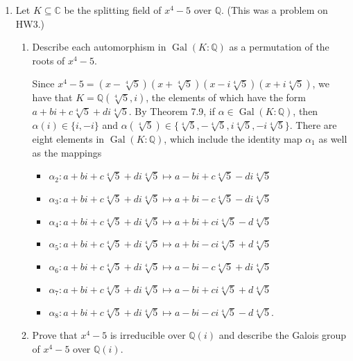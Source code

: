 \documentclass[12pt]{article}
\newcommand{\QQ}{\mathbb{Q}}
\newcommand{\CC}{\mathbb{C}}
\DeclareMathOperator{\Gal}{Gal}
\begin{document}
\begin{enumerate}
    \item
        Let $K \subseteq \CC$ be the splitting field of $x^4-5$ over $\QQ$. (This was a problem on HW3.)
        \begin{enumerate}
            \item
                Describe each automorphism in $\Gal(K:\QQ)$ as a permutation of the roots of $x^4-5$. \par
                Since $x^4 - 5 = (x - \sqrt[4]{5})(x + \sqrt[4]{5})(x - i\sqrt[4]{5})(x + i\sqrt[4]{5})$, we have that $K = \QQ(\sqrt[4]{5}, i)$, the elements of which have the form $a + bi + c\sqrt[4]{5} + di\sqrt[4]{5}$. By Theorem 7.9, if $\alpha \in \Gal(K:\QQ)$, then $\alpha(i) \in \{ i, -i \}$ and $\alpha(\sqrt[4]{5}) \in \{ \sqrt[4]{5}, -\sqrt[4]{5}, i\sqrt[4]{5}, -i\sqrt[4]{5} \}$. There are eight elements in $\Gal(K:\QQ)$, which include the identity map $\alpha_1$ as well as the mappings
                \begin{itemize}
                    \item
                        $\alpha_2 : a + bi + c\sqrt[4]{5} + di\sqrt[4]{5} \mapsto a - bi + c\sqrt[4]{5} - di\sqrt[4]{5}$
                    \item
                        $\alpha_3 : a + bi + c\sqrt[4]{5} + di\sqrt[4]{5} \mapsto a + bi - c\sqrt[4]{5} - di\sqrt[4]{5}$
                    \item
                        $\alpha_4 : a + bi + c\sqrt[4]{5} + di\sqrt[4]{5} \mapsto a + bi + ci\sqrt[4]{5} - d\sqrt[4]{5}$
                    \item
                        $\alpha_5 : a + bi + c\sqrt[4]{5} + di\sqrt[4]{5} \mapsto a + bi - ci\sqrt[4]{5} + d\sqrt[4]{5}$
                    \item
                        $\alpha_6 : a + bi + c\sqrt[4]{5} + di\sqrt[4]{5} \mapsto a - bi - c\sqrt[4]{5} + di\sqrt[4]{5}$
                    \item
                        $\alpha_7 : a + bi + c\sqrt[4]{5} + di\sqrt[4]{5} \mapsto a - bi + ci\sqrt[4]{5} + d\sqrt[4]{5}$
                    \item
                        $\alpha_8 : a + bi + c\sqrt[4]{5} + di\sqrt[4]{5} \mapsto a - bi - ci\sqrt[4]{5} - d\sqrt[4]{5}$.
                \end{itemize}
            \item
                Prove that $x^4-5$ is irreducible over $\QQ(i)$ and describe the Galois group of $x^4-5$ over $\QQ(i)$. \par

\end{enumerate}
\end{enumerate}
\end{document}
